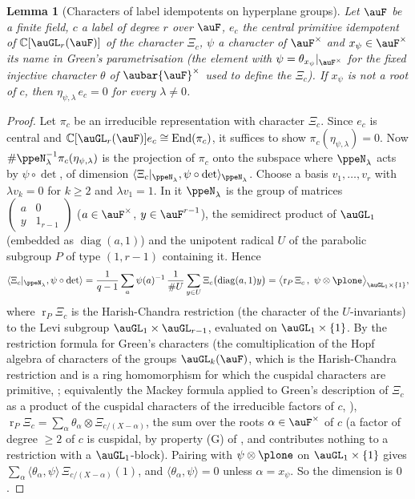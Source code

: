 \documentclass[10pt]{amsart}
\newtheorem{lemma}[theorem]{Lemma}
\theoremstyle{definition}
\theoremstyle{remark}
\newcommand{\C}{\mathbb C}
\begin{document}
\begin{lemma}[Characters of label idempotents on hyperplane groups]\label{ppe:green}
Let $\auF$ be a finite field, $c$ a label of degree $r$ over $\auF$, $e_c$ the central primitive
idempotent of $\C[\auGL_r(\auF)]$ of the character $\Xi_c$, $\psi$ a character of $\auF^\times$
and $x_\psi\in\auF^\times$ its name in Green's parametrisation (the element with
$\psi=\theta_{x_\psi}|_{\auF^\times}$ for the fixed injective character $\theta$ of
$\aubar{\auF}^\times$ used to define the $\Xi_c$). If $x_\psi$ is not a root of $c$, then
$\eta_{\psi,\lambda}\,e_c=0$ for every $\lambda\ne0$.
\end{lemma}
\begin{proof}
Let $\pi_c$ be an irreducible representation with character $\Xi_c$. Since $e_c$ is central and
$\C[\auGL_r(\auF)]e_c\cong\operatorname{End}(\pi_c)$, it suffices to show $\pi_c(\eta_{\psi,
\lambda})=0$. Now $\#\ppeN_\lambda^{-1}\pi_c(\eta_{\psi,\lambda})$ is the projection of $\pi_c$
onto the subspace where $\ppeN_\lambda$ acts by $\psi\circ\det$, of dimension
$\langle\Xi_c|_{\ppeN_\lambda},\psi\circ\det\rangle_{\ppeN_\lambda}$. Choose a basis
$v_1,\dots,v_r$ with $\lambda v_k=0$ for $k\ge2$ and $\lambda v_1=1$. In it $\ppeN_\lambda$ is the
group of matrices $\begin{pmatrix}a&0\\ y&1_{r-1}\end{pmatrix}$ ($a\in\auF^\times$,
$y\in\auF^{r-1}$), the semidirect product of $\auGL_1$ (embedded as $\operatorname{diag}(a,1)$) and
the unipotent radical $U$ of the parabolic subgroup $P$ of type $(1,r-1)$ containing it. Hence
\[
\langle\Xi_c|_{\ppeN_\lambda},\psi\circ\det\rangle=\frac1{q-1}\sum_{a}\psi(a)^{-1}\,
\frac1{\#U}\sum_{y\in U}\Xi_c\bigl(\operatorname{diag}(a,1)y\bigr)
=\bigl\langle\operatorname{r}_P\Xi_c\,,\ \psi\otimes\plone\bigr\rangle_{\auGL_1\times\{1\}},
\]
where $\operatorname{r}_P\Xi_c$ is the Harish-Chandra restriction (the character of the
$U$-invariants) to the Levi subgroup $\auGL_1\times\auGL_{r-1}$, evaluated on $\auGL_1\times\{1\}$.
By the restriction formula for Green's characters (the comultiplication of the Hopf algebra of
characters of the groups $\auGL_k(\auF)$, which is the Harish-Chandra restriction and is a ring homomorphism for which the cuspidal characters are primitive, \cite[\S\S9.1--9.2, pp.~110--111]{ZelevinskyLNM}; equivalently
the Mackey formula applied to Green's description of $\Xi_c$ as a product of the cuspidal
characters of the irreducible factors of $c$, \cite[p.~403 and Thm.~13]{Green1955}), $\operatorname{r}_P\Xi_c=
\sum_{\alpha}\theta_\alpha\otimes\Xi_{c/(X-\alpha)}$, the sum over the roots $\alpha\in\auF^\times$
of $c$ (a factor of degree $\ge2$ of $c$ is cuspidal, by property (G) of {\cite[\S4.1.8]{P51}}, and contributes nothing to a restriction
with a $\auGL_1$-block). Pairing with $\psi\otimes\plone$ on $\auGL_1\times\{1\}$ gives
$\sum_\alpha\langle\theta_\alpha,\psi\rangle\,\Xi_{c/(X-\alpha)}(1)$, and
$\langle\theta_\alpha,\psi\rangle=0$ unless $\alpha=x_\psi$. So the dimension is $0$.
\end{proof}
\end{document}

